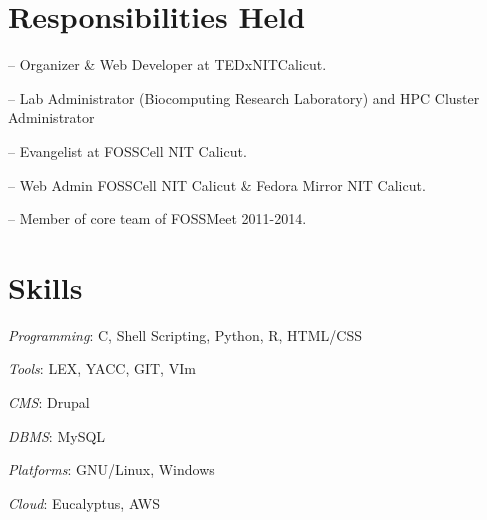 \documentclass[margin,line]{resume}
\begin{document}
\begin{resume}
    \section{\mysidestyle Responsibilities Held } 
	\begin{list2}
	\item[--] Organizer \& Web Developer at TEDxNITCalicut.
	\item[--] Lab Administrator (Biocomputing Research Laboratory) and HPC Cluster Administrator
	\item[--] Evangelist at FOSSCell NIT Calicut.	
	\item[--] Web Admin FOSSCell NIT Calicut \& Fedora Mirror NIT Calicut.
	\item[--] Member of core team of FOSSMeet 2011-2014.
	
	
	\end{list2}

    \section{\mysidestyle Skills} 
    	\begin{list2}
	\item \textit{Programming}: C, Shell Scripting, Python, R, HTML/CSS 
	\item \textit{Tools}: LEX, YACC, GIT, VIm
	\item \textit{CMS}: Drupal
	\item \textit{DBMS}: MySQL
	\item \textit{Platforms}: GNU/Linux, Windows
	\item \textit{Cloud}: Eucalyptus, AWS
	\end{list2}




\end{resume}
\end{document}
